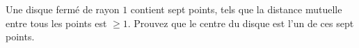 Une disque fermé de rayon $1$ contient sept points, tels que la distance
mutuelle entre tous les points est $\geq 1$. Prouvez que le centre du disque
est l'un de ces sept points.
